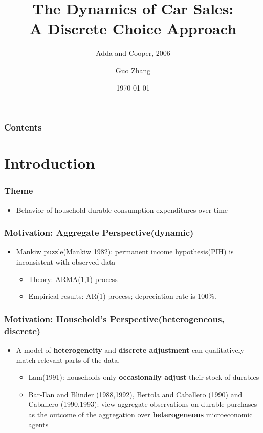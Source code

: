 \documentclass{beamer}
\title{The Dynamics of Car Sales: \\ A Discrete Choice
Approach}
\subtitle{Adda and Cooper, 2006}
\author{Guo Zhang}
\institute[Universities of]
{
WISE, Xiamen University
}
\date{\today}
\begin{document}
\begin{frame}[plain]
\titlepage
\end{frame}

\begin{frame}[plain] %
\frametitle{Contents}
\begin{multicols}{2}
  \tableofcontents
\end{multicols}
\end{frame}

\section{Introduction}
\begin{frame}
\frametitle{Theme}
\begin{itemize}
\item Behavior of household durable consumption expenditures over time
\end{itemize}
\end{frame}

\begin{frame}
\frametitle{Motivation: Aggregate Perspective(dynamic)}
\begin{itemize}
\item Mankiw puzzle(Mankiw 1982): permanent income hypothesis(PIH) is inconsistent with observed data
    \begin{itemize}
    \item Theory: ARMA(1,1) process
    \item Empirical results: AR(1) process; depreciation rate is 100\%.
    \end{itemize}
\end{itemize}
\end{frame}

\begin{frame}
\frametitle{Motivation: Household's Perspective(heterogeneous, discrete)}
\begin{itemize}
\item A model of \textbf{heterogeneity} and \textbf{discrete adjustment} can qualitatively match relevant parts of the data.
    \begin{itemize}
    \item Lam(1991): households only \textbf{occasionally adjust} their stock of durables
    \item Bar-Ilan and Blinder (1988,1992), Bertola and Caballero (1990) and Caballero (1990,1993): view aggregate observations on durable purchases as the outcome of the aggregation over \textbf{heterogeneous} microeconomic agents
    \end{itemize}
\end{itemize}
\end{frame}
\end{document}
